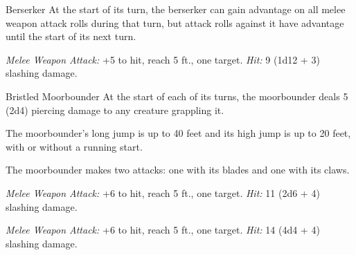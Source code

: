 \documentclass[10pt,a4paper,twoside,twocolumn,openany,nodeprecatedcode]{dndbook}
\begin{document}
\begin{DndMonster}[float=ht]{Berserker}
\DndMonsterBasics[
armor-class = {13 (hide armor)},
hit-points = {\DndDice{9d8 + 27}},
speed = {30 ft.}
]
\DndMonsterAbilityScores[
 str = 16,
 dex = 12,
 con = 17,
 int = 9,
 wis = 11,
 cha = 9
]
\DndMonsterDetails[
languages = {any one language (usually Common)},
challenge = 2,
]
At the start of its turn, the berserker can gain advantage on all melee weapon attack rolls during that turn, but attack rolls against it have advantage until the start of its next turn.

\par
{}
\textsl{Melee Weapon Attack:} +5 to hit, reach 5 ft., one target. \textsl{Hit:} 9 (1d12 + 3) slashing damage.

\end{DndMonster}


\clearpage
{}

\begin{DndMonster}[float=ht]{Bristled Moorbounder}
\DndMonsterBasics[
armor-class = {15 (natural armor)},
hit-points = {\DndDice{7d10 + 14}},
speed = {70 ft.}
]
\DndMonsterAbilityScores[
 str = 18,
 dex = 14,
 con = 14,
 int = 2,
 wis = 13,
 cha = 5
]
\DndMonsterDetails[
senses = {darkvision 60 ft., passive perception 11},
challenge = 3,
]
At the start of each of its turns, the moorbounder deals 5 (2d4) piercing damage to any creature grappling it.

The moorbounder's long jump is up to 40 feet and its high jump is up to 20 feet, with or without a running start.

\par
{}
The moorbounder makes two attacks: one with its blades and one with its claws.

\textsl{Melee Weapon Attack:} +6 to hit, reach 5 ft., one target. \textsl{Hit:} 11 (2d6 + 4) slashing damage.

\textsl{Melee Weapon Attack:} +6 to hit, reach 5 ft., one target. \textsl{Hit:} 14 (4d4 + 4) slashing damage.

\end{DndMonster}
\end{document}
